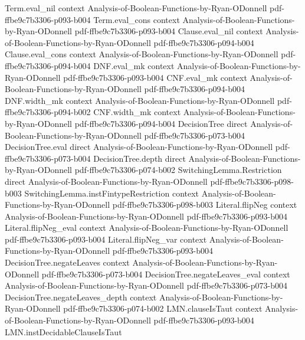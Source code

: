 \begin{lemma}
\proofstep
  {Term.eval_nil}
  {context}
  {Analysis-of-Boolean-Functions-by-Ryan-ODonnell}
  {pdf-ffbe9c7b3306-p093-b004}
\proofstep
  {Term.eval_cons}
  {context}
  {Analysis-of-Boolean-Functions-by-Ryan-ODonnell}
  {pdf-ffbe9c7b3306-p093-b004}
\proofstep
  {Clause.eval_nil}
  {context}
  {Analysis-of-Boolean-Functions-by-Ryan-ODonnell}
  {pdf-ffbe9c7b3306-p094-b004}
\proofstep
  {Clause.eval_cons}
  {context}
  {Analysis-of-Boolean-Functions-by-Ryan-ODonnell}
  {pdf-ffbe9c7b3306-p094-b004}
\proofstep
  {DNF.eval_mk}
  {context}
  {Analysis-of-Boolean-Functions-by-Ryan-ODonnell}
  {pdf-ffbe9c7b3306-p093-b004}
\proofstep
  {CNF.eval_mk}
  {context}
  {Analysis-of-Boolean-Functions-by-Ryan-ODonnell}
  {pdf-ffbe9c7b3306-p094-b004}
\proofstep
  {DNF.width_mk}
  {context}
  {Analysis-of-Boolean-Functions-by-Ryan-ODonnell}
  {pdf-ffbe9c7b3306-p094-b002}
\proofstep
  {CNF.width_mk}
  {context}
  {Analysis-of-Boolean-Functions-by-Ryan-ODonnell}
  {pdf-ffbe9c7b3306-p094-b004}
\proofstep
  {DecisionTree}
  {direct}
  {Analysis-of-Boolean-Functions-by-Ryan-ODonnell}
  {pdf-ffbe9c7b3306-p073-b004}
\proofstep
  {DecisionTree.eval}
  {direct}
  {Analysis-of-Boolean-Functions-by-Ryan-ODonnell}
  {pdf-ffbe9c7b3306-p073-b004}
\proofstep
  {DecisionTree.depth}
  {direct}
  {Analysis-of-Boolean-Functions-by-Ryan-ODonnell}
  {pdf-ffbe9c7b3306-p074-b002}
\proofstep
  {SwitchingLemma.Restriction}
  {direct}
  {Analysis-of-Boolean-Functions-by-Ryan-ODonnell}
  {pdf-ffbe9c7b3306-p098-b003}
\proofstep
  {SwitchingLemma.instFintypeRestriction}
  {context}
  {Analysis-of-Boolean-Functions-by-Ryan-ODonnell}
  {pdf-ffbe9c7b3306-p098-b003}
\proofstep
  {Literal.flipNeg}
  {context}
  {Analysis-of-Boolean-Functions-by-Ryan-ODonnell}
  {pdf-ffbe9c7b3306-p093-b004}
\proofstep
  {Literal.flipNeg_eval}
  {context}
  {Analysis-of-Boolean-Functions-by-Ryan-ODonnell}
  {pdf-ffbe9c7b3306-p093-b004}
\proofstep
  {Literal.flipNeg_var}
  {context}
  {Analysis-of-Boolean-Functions-by-Ryan-ODonnell}
  {pdf-ffbe9c7b3306-p093-b004}
\proofstep
  {DecisionTree.negateLeaves}
  {context}
  {Analysis-of-Boolean-Functions-by-Ryan-ODonnell}
  {pdf-ffbe9c7b3306-p073-b004}
\proofstep
  {DecisionTree.negateLeaves_eval}
  {context}
  {Analysis-of-Boolean-Functions-by-Ryan-ODonnell}
  {pdf-ffbe9c7b3306-p073-b004}
\proofstep
  {DecisionTree.negateLeaves_depth}
  {context}
  {Analysis-of-Boolean-Functions-by-Ryan-ODonnell}
  {pdf-ffbe9c7b3306-p074-b002}
\proofstep
  {LMN.clauseIsTaut}
  {context}
  {Analysis-of-Boolean-Functions-by-Ryan-ODonnell}
  {pdf-ffbe9c7b3306-p093-b004}
\proofstep
  {LMN.instDecidableClauseIsTaut}

\end{lemma}
